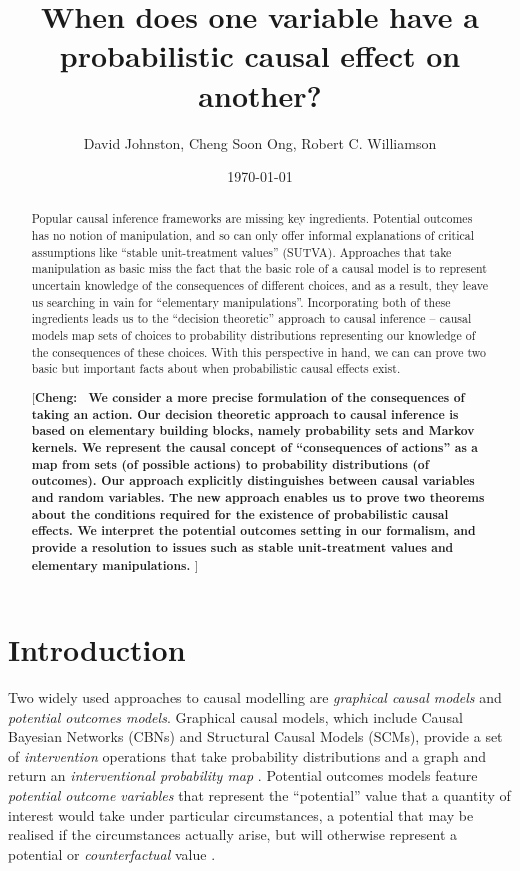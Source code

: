 \documentclass{article}
\title{When does one variable have a probabilistic causal effect on another?}
\date{\today}
\author{ David Johnston, Cheng Soon Ong, Robert C. Williamson }
\theoremstyle{plain}
\theoremstyle{definition}
\newcommand{\cheng}[1]{ {\color{purple}[{\bf Cheng:~{#1}}]} }
\begin{document}
\maketitle


\tableofcontents

\begin{abstract}
Popular causal inference frameworks are missing key ingredients. Potential outcomes has no notion of manipulation, and so can only offer informal explanations of critical assumptions like ``stable unit-treatment values'' (SUTVA). Approaches that take manipulation as basic miss the fact that the basic role of a causal model is to represent uncertain knowledge of the consequences of different choices, and as a result, they leave us searching in vain for ``elementary manipulations''. Incorporating both of these ingredients leads us to the ``decision theoretic'' approach to causal inference -- causal models map sets of choices to probability distributions representing our knowledge of the consequences of these choices. With this perspective in hand, we can can prove two basic but important facts about when probabilistic causal effects exist.

\cheng{
We consider a more precise formulation of the consequences of taking an action.
Our decision theoretic approach to causal inference is based on elementary
building blocks, namely probability sets and Markov kernels. We represent
the causal concept of ``consequences of actions'' as a map from sets
(of possible actions) to probability distributions (of outcomes).
Our approach explicitly distinguishes between causal variables
and random variables. The new
approach enables us to prove two theorems about the conditions required for
the existence of probabilistic causal effects. We interpret the potential
outcomes setting in our formalism, and provide a resolution to issues such as
stable unit-treatment values and elementary manipulations.
}
\end{abstract}

\section{Introduction}

Two widely used approaches to causal modelling are \emph{graphical causal models} and \emph{potential outcomes models}. Graphical causal models, which include Causal Bayesian Networks (CBNs) and Structural Causal Models (SCMs), provide a set of \emph{intervention} operations that take probability distributions and a graph and return an \emph{interventional probability map} \citep{pearl_causality:_2009}. Potential outcomes models feature \emph{potential outcome variables} that represent the ``potential'' value that a quantity of interest would take under particular circumstances, a potential that may be realised if the circumstances actually arise, but will otherwise represent a potential or \emph{counterfactual} value \citep{rubin_causal_2005}.
\end{document}
